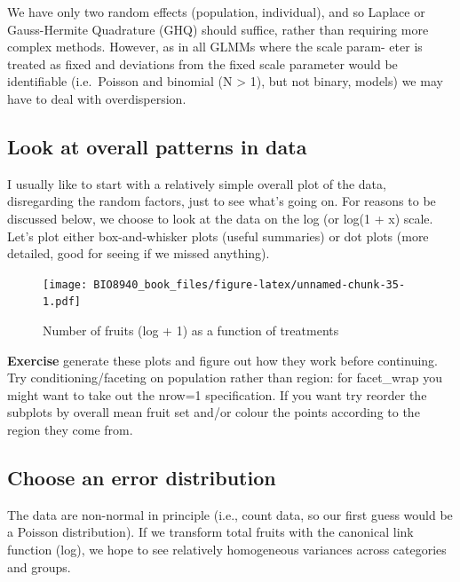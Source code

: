 \documentclass[
  12pt,
]{book}
\makeatletter
\newenvironment{kframe}{%
\medskip{}
\setlength{\fboxsep}{.8em}
\def\at@end@of@kframe{}%
\ifinner\ifhmode%
 \def\at@end@of@kframe{\end{minipage}}%
 \begin{minipage}{\columnwidth}%
\fi\fi%
\def\FrameCommand##1{\hskip\@totalleftmargin \hskip-\fboxsep
\colorbox{incolor}{##1}\hskip-\fboxsep
    \hskip-\linewidth \hskip-\@totalleftmargin \hskip\columnwidth}%
\MakeFramed {\advance\hsize-\width
  \@totalleftmargin\z@ \linewidth\hsize
  \@setminipage}}%
{\par\unskip\endMakeFramed%
\at@end@of@kframe}
\newenvironment{rmdblock}[1]
 {
 \begin{itemize}
 \renewcommand{\labelitemi}{
   \raisebox{-.7\height}[0pt][0pt]{
     {\setkeys{Gin}{width=3em,keepaspectratio}\texttt{[image: images/icons/\#1]}}
   }
 }
 \begin{kframe}
 \setlength{\fboxsep}{1em}
 \item
 }
 {
 \end{kframe}
 \end{itemize}
 }
\newenvironment{rmdcode}
  {\begin{rmdblock}{code}}
  {\end{rmdblock}}
\makeatother
\begin{document}
We have only two random effects (population, individual), and so Laplace or Gauss-Hermite Quadrature (GHQ) should suffice, rather than requiring more complex methods. However, as in all GLMMs where the scale param- eter is treated as fixed and deviations from the fixed scale parameter would be identifiable (i.e.~Poisson and binomial (N \textgreater{} 1), but not binary, models) we may have to deal with overdispersion.

\hypertarget{look-at-overall-patterns-in-data}{%
\subsection{Look at overall patterns in data}\label{look-at-overall-patterns-in-data}}

I usually like to start with a relatively simple overall plot of the data, disregarding the random factors, just to see what's going on. For reasons to be discussed below, we choose to look at the data on the log (or log(1 + x) scale. Let's plot either box-and-whisker plots (useful summaries) or dot plots (more detailed, good for seeing if we missed anything).

\begin{figure}
\centering
\texttt{[image: BIO8940\_book\_files/figure-latex/unnamed-chunk-35-1.pdf]}
\caption{\label{fig:unnamed-chunk-35}Number of fruits (log + 1) as a function of treatments}
\end{figure}

\begin{rmdcode}
\textbf{Exercise} generate these plots and figure out how they work before continuing. Try conditioning/faceting on population rather than region: for facet\_wrap you might want to take out the nrow=1 specification. If you want try reorder the subplots by overall mean fruit set and/or colour the points according to the region they come from.
\end{rmdcode}

\hypertarget{choose-an-error-distribution}{%
\subsection{Choose an error distribution}\label{choose-an-error-distribution}}

The data are non-normal in principle (i.e., count data, so our first guess would be a Poisson distribution). If we transform total fruits with the canonical link function (log), we hope to see relatively homogeneous variances across categories and groups.
\end{document}
